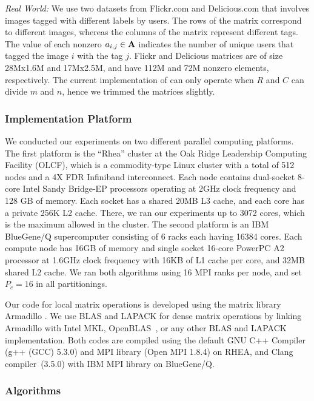 {\em Real World:} We use two datasets from Flickr.com and Delicious.com that involves images tagged with different labels by users.
The rows of the matrix correspond to different images, whereas the columns of the matrix represent different tags. The value of 
each nonzero $a_{i,j} \in \mathbf{A}$ indicates the number of unique users that tagged the image $i$ with the tag $j$.
Flickr and Delicious matrices are of size 28Mx1.6M and 17Mx2.5M, and have 112M and 72M nonzero elements, respectively.
The current implementation of \mpifaun can only operate when $R$ and $C$ can divide $m$ and $n$, hence we trimmed the matrices slightly.

\subsubsection{Implementation Platform}
We conducted our experiments on two different parallel computing platforms.
The first platform is the ``Rhea'' cluster at the Oak Ridge Leadership Computing Facility (OLCF), which is a commodity-type Linux cluster with a total of 512 nodes and a 4X FDR Infiniband interconnect.
Each node contains dual-socket 8-core Intel Sandy Bridge-EP processors operating at 2GHz clock frequency and 128 GB of memory.
Each socket has a shared 20MB L3 cache, and each core has a private 256K L2 cache. 
There, we ran our experiments up to 3072 cores, which is the maximum allowed in the cluster.
The second platform is an IBM BlueGene/Q supercomputer consisting of 6 racks each having 16384 cores.
Each compute node has 16GB of memory and single socket 16-core PowerPC A2 processor at 1.6GHz clock frequency with 16KB of L1 cache per core, and 32MB shared L2 cache.
We ran both algorithms using 16 MPI ranks per node, and set $P_c = 16$ in all partitionings.

Our code for local matrix operations is developed using the matrix library Armadillo \cite{sanderson2010}. 
We use BLAS and LAPACK for dense matrix operations by linking Armadillo with Intel MKL, OpenBLAS~\cite{xianyi2015}, or any other BLAS and LAPACK implementation.
Both codes are compiled using the default GNU C++ Compiler (g++ (GCC) 5.3.0) and MPI library (Open MPI 1.8.4) on RHEA, and Clang compiler~(3.5.0) with IBM MPI library on BlueGene/Q.

\subsubsection{Algorithms}

